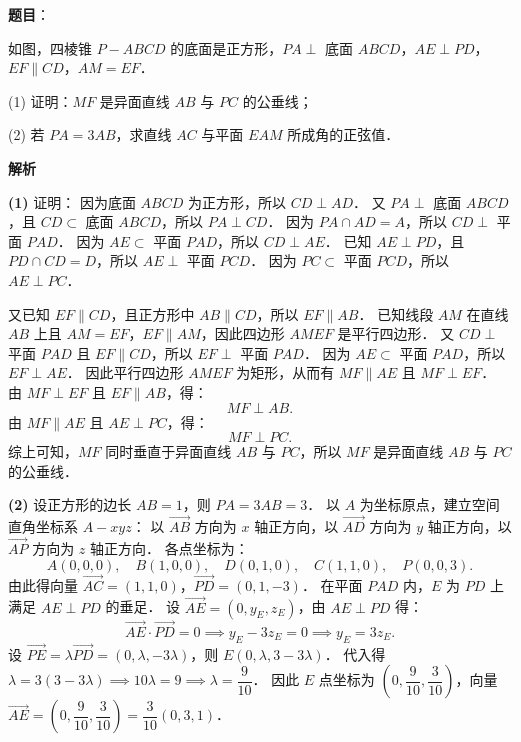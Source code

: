 \begin{answer}

\textbf{题目}：

如图，四棱锥 $P - ABCD$ 的底面是正方形，$PA \perp$ 底面 $ABCD$，$AE \perp PD$，$EF \parallel CD$，$AM = EF$．
\nopagebreak[4]
\begin{center}\end{center}
\nopagebreak[4]
(1) 证明：$MF$ 是异面直线 $AB$ 与 $PC$ 的公垂线；

(2) 若 $PA = 3AB$，求直线 $AC$ 与平面 $EAM$ 所成角的正弦值．

\textbf{解析}
\nopagebreak[4]
\begin{center}\end{center}
\nopagebreak[4]
\textbf{(1)}
证明：
因为底面 $ABCD$ 为正方形，所以 $CD \perp AD$．
又 $PA \perp$ 底面 $ABCD$，且 $CD \subset$ 底面 $ABCD$，所以 $PA \perp CD$．
因为 $PA \cap AD = A$，所以 $CD \perp$ 平面 $PAD$．
因为 $AE \subset$ 平面 $PAD$，所以 $CD \perp AE$．
已知 $AE \perp PD$，且 $PD \cap CD = D$，所以 $AE \perp$ 平面 $PCD$．
因为 $PC \subset$ 平面 $PCD$，所以 $AE \perp PC$．

又已知 $EF \parallel CD$，且正方形中 $AB \parallel CD$，所以 $EF \parallel AB$．
已知线段 $AM$ 在直线 $AB$ 上且 $AM = EF$，$EF \parallel AM$，因此四边形 $AMEF$ 是平行四边形．
又 $CD \perp$ 平面 $PAD$ 且 $EF \parallel CD$，所以 $EF \perp$ 平面 $PAD$．
因为 $AE \subset$ 平面 $PAD$，所以 $EF \perp AE$．
因此平行四边形 $AMEF$ 为矩形，从而有 $MF \parallel AE$ 且 $MF \perp EF$．
由 $MF \perp EF$ 且 $EF \parallel AB$，得：
\nopagebreak[4]
\[
MF \perp AB.
\]
由 $MF \parallel AE$ 且 $AE \perp PC$，得：
\nopagebreak[4]
\[
MF \perp PC.
\]
综上可知，$MF$ 同时垂直于异面直线 $AB$ 与 $PC$，所以 $MF$ 是异面直线 $AB$ 与 $PC$ 的公垂线．

\textbf{(2)}
设正方形的边长 $AB = 1$，则 $PA = 3AB = 3$．
以 $A$ 为坐标原点，建立空间直角坐标系 $A - xyz$：
以 $\overrightarrow{AB}$ 方向为 $x$ 轴正方向，以 $\overrightarrow{AD}$ 方向为 $y$ 轴正方向，以 $\overrightarrow{AP}$ 方向为 $z$ 轴正方向．
各点坐标为：
\nopagebreak[4]
\[
A(0, 0, 0), \quad B(1, 0, 0), \quad D(0, 1, 0), \quad C(1, 1, 0), \quad P(0, 0, 3).
\]
由此得向量 $\overrightarrow{AC} = (1, 1, 0)$，$\overrightarrow{PD} = (0, 1, -3)$．
在平面 $PAD$ 内，$E$ 为 $PD$ 上满足 $AE \perp PD$ 的垂足．
设 $\overrightarrow{AE} = (0, y_E, z_E)$，由 $AE \perp PD$ 得：
\nopagebreak[4]
\[
\overrightarrow{AE} \cdot \overrightarrow{PD} = 0 \implies y_E - 3z_E = 0 \implies y_E = 3z_E.
\]
设 $\overrightarrow{PE} = \lambda \overrightarrow{PD} = (0, \lambda, -3\lambda)$，则 $E(0, \lambda, 3 - 3\lambda)$．
代入得 $\lambda = 3(3 - 3\lambda) \implies 10\lambda = 9 \implies \lambda = \dfrac{9}{10}$．
因此 $E$ 点坐标为 $\left(0, \dfrac{9}{10}, \dfrac{3}{10}\right)$，向量 $\overrightarrow{AE} = \left(0, \dfrac{9}{10}, \dfrac{3}{10}\right) = \dfrac{3}{10}(0, 3, 1)$．


\end{answer}
